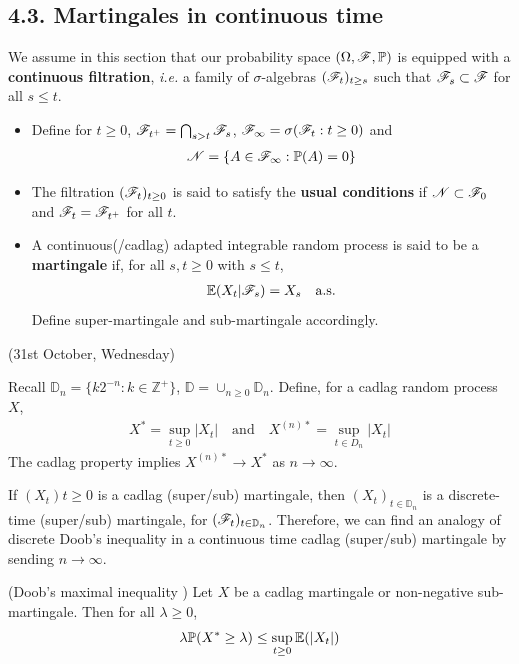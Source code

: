 \documentclass[10pt,a4paper]{report}
\begin{document}
\subsection*{4.3. Martingales in continuous time}

We assume in this section that our probability space $(\Omega, \mathscr{F}, \mathbb{P})$ is equipped with a \textbf{continuous filtration}, \emph{i.e.} a family of $\sigma$-algebras $(\mathscr{F}_t)_{t\geq s}$ such that $\mathscr{F}_s \subset \mathscr{F}$ for all $s\leq t$.

\begin{itemize}
\item Define for $t\geq 0$, $\mathscr{F}_{t^+} = \bigcap_{s>t} \mathscr{F}_s$, $\mathscr{F}_{\infty}  = \sigma(\mathscr{F}_t : t\geq 0)$ and
\begin{align*}
\mathscr{N} = \{A\in \mathscr{F}_{\infty} : \mathbb{P}(A) =0 \}
\end{align*}
\item The filtration $(\mathscr{F}_t)_{t\geq 0}$ is said to satisfy the \textbf{usual conditions} if $\mathscr{N} \subset \mathscr{F}_{0}$ and $\mathscr{F}_t = \mathscr{F}_{t^+}$ for all $t$.
\item A continuous(/cadlag) adapted integrable random process is said to be a \textbf{martingale} if, for all $s,t\geq 0$ with $s\leq t$,
\begin{align*}
\mathbb{E}(X_t|\mathscr{F}_s) = X_s \quad \text{a.s.} 
\end{align*}
Define super-martingale and sub-martingale accordingly.
\end{itemize}
\s

\newday

(31st October, Wednesday)
\s

Recall $\mathbb{D}_n = \{k2^{-n} : k\in \mathbb{Z}^+ \}$, $\mathbb{D} = \cup_{n\geq 0}\mathbb{D}_n$. Define, for a cadlag random process $X$,
\begin{align*}
X^* = \sup_{t\geq 0}|X_t| \quad \text{and} \quad X^{(n)*} = \sup_{t\in D_n} |X_t|
\end{align*}
The cadlag property implies $X^{(n)*} \rightarrow X^*$ as $n\rightarrow \infty$.

\quad If $(X_t){t\geq 0}$ is a cadlag (super/sub) martingale, then $(X_t)_{t\in \mathbb{D}_n}$ is a discrete-time (super/sub) martingale, for $(\mathscr{F}_t)_{t\in \mathbb{D}_n}$. Therefore, we can find an analogy of discrete Doob's inequality in a continuous time cadlag (super/sub) martingale by sending $n\rightarrow \infty$.
\s

(Doob's maximal inequality ) Let $X$ be a cadlag martingale or non-negative sub-martingale. Then for all $\lambda \geq0$,
\begin{align*}
\lambda \mathbb{P} (X^* \geq \lambda) \leq \sup_{t\geq 0} \mathbb{E}(|X_t|)
\end{align*}
\s
\end{document}
